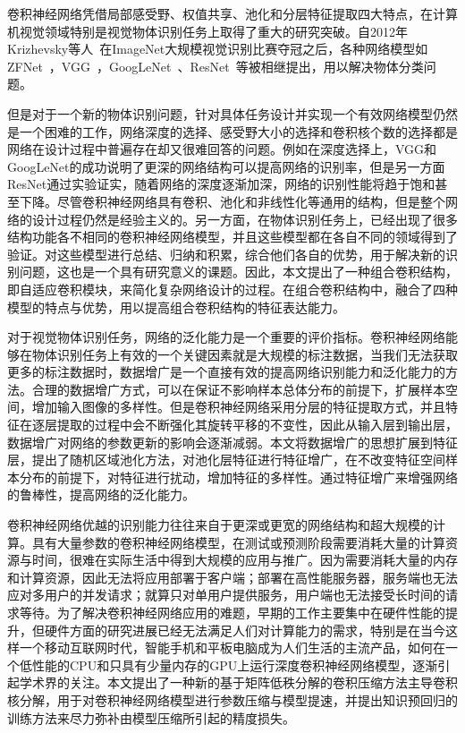 卷积神经网络凭借局部感受野、权值共享、池化和分层特征提取四大特点，在计算机视觉领域特别是视觉物体识别任务上取得了重大的研究突破。自2012年Krizhevsky等人~\cite{krizhevsky2012imagenet}在ImageNet大规模视觉识别比赛夺冠之后，各种网络模型如ZFNet~\cite{zeiler2014visualizing}，VGG~\cite{simonyan2014very}，GoogLeNet~\cite{szegedy2014going,szegedy2015rethinking,szegedy2016inception}、ResNet~\cite{he2015deep}等被相继提出，用以解决物体分类问题。

但是对于一个新的物体识别问题，针对具体任务设计并实现一个有效网络模型仍然是一个困难的工作，网络深度的选择、感受野大小的选择和卷积核个数的选择都是网络在设计过程中普遍存在却又很难回答的问题。例如在深度选择上，VGG和GoogLeNet的成功说明了更深的网络结构可以提高网络的识别率，但是另一方面ResNet通过实验证实，随着网络的深度逐渐加深，网络的识别性能将趋于饱和甚至下降。尽管卷积神经网络具有卷积、池化和非线性化等通用的结构，但是整个网络的设计过程仍然是经验主义的。另一方面，在物体识别任务上，已经出现了很多结构功能各不相同的卷积神经网络模型，并且这些模型都在各自不同的领域得到了验证。对这些模型进行总结、归纳和积累，综合他们各自的优势，用于解决新的识别问题，这也是一个具有研究意义的课题。因此，本文提出了一种组合卷积结构，即自适应卷积模块，来简化复杂网络设计的过程。在组合卷积结构中，融合了四种模型的特点与优势，用以提高组合卷积结构的特征表达能力。

对于视觉物体识别任务，网络的泛化能力是一个重要的评价指标。卷积神经网络能够在物体识别任务上有效的一个关键因素就是大规模的标注数据，当我们无法获取更多的标注数据时，数据增广是一个直接有效的提高网络识别能力和泛化能力的方法。合理的数据增广方式，可以在保证不影响样本总体分布的前提下，扩展样本空间，增加输入图像的多样性。但是卷积神经网络采用分层的特征提取方式，并且特征在逐层提取的过程中会不断强化其旋转平移的不变性，因此从输入层到输出层，数据增广对网络的参数更新的影响会逐渐减弱。本文将数据增广的思想扩展到特征层，提出了随机区域池化方法，对池化层特征进行特征增广，在不改变特征空间样本分布的前提下，对特征进行扰动，增加特征的多样性。通过特征增广来增强网络的鲁棒性，提高网络的泛化能力。

卷积神经网络优越的识别能力往往来自于更深或更宽的网络结构和超大规模的计算。具有大量参数的卷积神经网络模型，在测试或预测阶段需要消耗大量的计算资源与时间，很难在实际生活中得到大规模的应用与推广。因为需要消耗大量的内存和计算资源，因此无法将应用部署于客户端；部署在高性能服务器，服务端也无法应对多用户的并发请求；就算只对单用户提供服务，用户端也无法接受长时间的请求等待。为了解决卷积神经网络应用的难题，早期的工作主要集中在硬件性能的提升，但硬件方面的研究进展已经无法满足人们对计算能力的需求，特别是在当今这样一个移动互联网时代，智能手机和平板电脑成为人们生活的主流产品，如何在一个低性能的CPU和只具有少量内存的GPU上运行深度卷积神经网络模型，逐渐引起学术界的关注。本文提出了一种新的基于矩阵低秩分解的卷积压缩方法主导卷积核分解，用于对卷积神经网络模型进行参数压缩与模型提速，并提出知识预回归的训练方法来尽力弥补由模型压缩所引起的精度损失。


